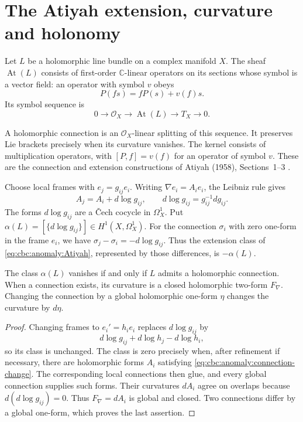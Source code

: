 \section{The Atiyah extension, curvature and holonomy}

Let $L$ be a holomorphic line bundle on a complex manifold $X$.
The sheaf $\operatorname{At}(L)$ consists of first-order $\mathbb C$-linear operators on its sections whose symbol is a vector field: an operator with symbol $v$ obeys
\[
 P(fs)=fP(s)+v(f)s.
\]
Its symbol sequence is
\begin{equation}\label{eq:cbc:anomaly:Atiyah}
 0\longrightarrow\mathcal O_X
  \longrightarrow\operatorname{At}(L)
  \longrightarrow T_X\longrightarrow0.
\end{equation}

A holomorphic connection is an $\mathcal O_X$-linear splitting of this sequence.
It preserves Lie brackets precisely when its curvature vanishes.
The kernel consists of multiplication operators, with $[P,f]=v(f)$ for an operator of symbol $v$.
These are the connection and extension constructions of Atiyah (1958), Sections~1--3 \cite{AtiyahConnections1958}.

Choose local frames with $e_j=g_{ij}e_i$.
Writing $\nabla e_i=A_i e_i$, the Leibniz rule gives
\begin{equation}\label{eq:cbc:anomaly:connection-change}
 A_j=A_i+d\log g_{ij},\qquad d\log g_{ij}=g_{ij}^{-1}dg_{ij}.
\end{equation}
The forms $d\log g_{ij}$ are a \v{C}ech cocycle in $\Omega_X^1$.
Put $\alpha(L)=[\{d\log g_{ij}\}]\in H^1(X,\Omega_X^1)$.
For the connection $\sigma_i$ with zero one-form in the frame $e_i$, we have $\sigma_j-\sigma_i=-d\log g_{ij}$.
Thus the extension class of \eqref{eq:cbc:anomaly:Atiyah}, represented by those differences, is $-\alpha(L)$.

\begin{proposition}\label{cbc:anomaly:line-obstruction}
The class $\alpha(L)$ vanishes if and only if $L$ admits a holomorphic connection.
When a connection exists, its curvature is a closed holomorphic two-form $F_\nabla$.
Changing the connection by a global holomorphic one-form $\eta$ changes the curvature by $d\eta$.
\end{proposition}
\begin{proof}
Changing frames to $e_i'=h_i e_i$ replaces $d\log g_{ij}$ by
\[
 d\log g_{ij}+d\log h_j-d\log h_i,
\]
so its class is unchanged.
The class is zero precisely when, after refinement if necessary, there are holomorphic forms $A_i$ satisfying \eqref{eq:cbc:anomaly:connection-change}.
The corresponding local connections then glue, and every global connection supplies such forms.
Their curvatures $dA_i$ agree on overlaps because $d(d\log g_{ij})=0$.
Thus $F_\nabla=dA_i$ is global and closed.
Two connections differ by a global one-form, which proves the last assertion.
\end{proof}

